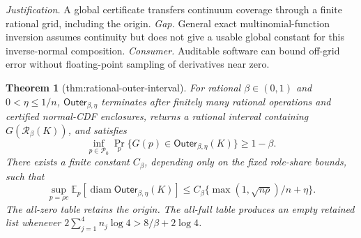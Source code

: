 \documentclass{article}
\newtheorem{theorem}{Theorem}
\begin{document}
\par\smallskip\noindent \textit{Justification.} A global certificate transfers continuum coverage through a finite rational grid, including the origin. \textit{Gap.} General exact multinomial-function inversion assumes continuity but does not give a usable global constant for this inverse-normal composition. \textit{Consumer.} Auditable software can bound off-grid error without floating-point sampling of derivatives near zero.

\begin{theorem}[thm:rational-outer-interval]\label{thm:rational-outer-interval}
For rational \(\beta\in(0,1)\) and \(0<\eta\le1/n\), \(\mathsf{Outer}_{\beta,\eta}\) terminates after finitely many rational operations and certified normal-CDF enclosures, returns a rational interval containing \(G(\mathcal R_{\beta}(K))\), and satisfies
\[
\inf_{p\in\mathcal P_0}\Pr_p\{G(p)\in\mathsf{Outer}_{\beta,\eta}(K)\}\ge1-\beta.
\]
There exists a finite constant \(C_{\beta}\), depending only on the fixed role-share bounds, such that
\[
\sup_{p=\rho c}\mathbb E_p[\operatorname{diam}\mathsf{Outer}_{\beta,\eta}(K)]
\le C_{\beta}\{\max(1,\sqrt{n\rho})/n+\eta\}.
\]
The all-zero table retains the origin.  The all-full table produces an empty retained list whenever \(2\sum_{j=1}^{4}n_j\log4>8/\beta+2\log4\).
\end{theorem}
\end{document}
